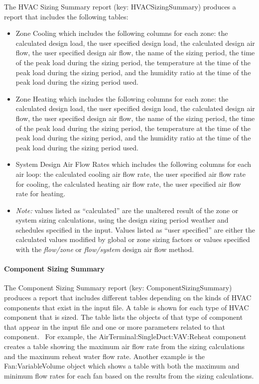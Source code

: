 The HVAC Sizing Summary report (key: HVACSizingSummary) produces a report that includes the following tables:

\begin{itemize}
\item
  Zone Cooling which includes the following columns for each zone: the calculated design load, the user specified design load, the calculated design air flow, the user specified design air flow, the name of the sizing period, the time of the peak load during the sizing period, the temperature at the time of the peak load during the sizing period, and the humidity ratio at the time of the peak load during the sizing period used.
\item
  Zone Heating which includes the following columns for each zone: the calculated design load, the user specified design load, the calculated design air flow, the user specified design air flow, the name of the sizing period, the time of the peak load during the sizing period, the temperature at the time of the peak load during the sizing period, and the humidity ratio at the time of the peak load during the sizing period used.
\item
  System Design Air Flow Rates which includes the following columns for each air loop: the calculated cooling air flow rate, the user specified air flow rate for cooling, the calculated heating air flow rate, the user specified air flow rate for heating.
\item
  \emph{Note:} values listed as ``calculated'' are the unaltered result of the zone or system sizing calculations, using the design sizing period weather and schedules specified in the input. Values listed as ``user specified'' are either the calculated values modified by global or zone sizing factors or values specified with the \emph{flow/zone} or \emph{flow/system} design air flow method.
\end{itemize}

\paragraph{Component Sizing Summary}\label{component-sizing-summary}

The Component Sizing Summary report (key: ComponentSizingSummary) produces a report that includes different tables depending on the kinds of HVAC components that exist in the input file. A table is shown for each type of HVAC component that is sized. The table lists the objects of that type of component that appear in the input file and one or more parameters related to that component.~ For example, the AirTerminal:SingleDuct:VAV:Reheat component creates a table showing the maximum air flow rate from the sizing calculations and the maximum reheat water flow rate. Another example is the Fan:VariableVolume object which shows a table with both the maximum and minimum flow rates for each fan based on the results from the sizing calculations.

